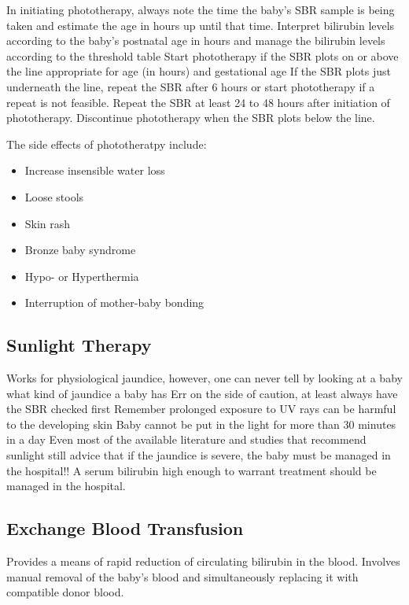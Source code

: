 \documentclass[
  letterpaper,
  DIV=11,
  numbers=noendperiod]{scrreprt}
\providecommand{\tightlist}{%
  \setlength{\itemsep}{0pt}\setlength{\parskip}{0pt}}\usepackage{longtable,booktabs,array}
\begin{document}
In initiating phototherapy, always note the time the baby's SBR sample
is being taken and estimate the age in hours up until that time.
Interpret bilirubin levels according to the baby's postnatal age in
hours and manage the bilirubin levels according to the threshold table
Start phototherapy if the SBR plots on or above the line appropriate for
age (in hours) and gestational age If the SBR plots just underneath the
line, repeat the SBR after 6 hours or start phototherapy if a repeat is
not feasible. Repeat the SBR at least 24 to 48 hours after initiation of
phototherapy. Discontinue phototherapy when the SBR plots below the
line.

The side effects of phototheratpy include:

\begin{itemize}
\tightlist
\item
  Increase insensible water loss
\item
  Loose stools
\item
  Skin rash
\item
  Bronze baby syndrome
\item
  Hypo- or Hyperthermia
\item
  Interruption of mother-baby bonding
\end{itemize}

\hypertarget{sunlight-therapy}{%
\subsection{Sunlight Therapy}\label{sunlight-therapy}}

Works for physiological jaundice, however, one can never tell by looking
at a baby what kind of jaundice a baby has Err on the side of caution,
at least always have the SBR checked first Remember prolonged exposure
to UV rays can be harmful to the developing skin Baby cannot be put in
the light for more than 30 minutes in a day Even most of the available
literature and studies that recommend sunlight still advice that if the
jaundice is severe, the baby must be managed in the hospital!! A serum
bilirubin high enough to warrant treatment should be managed in the
hospital.

\hypertarget{exchange-blood-transfusion}{%
\subsection{Exchange Blood
Transfusion}\label{exchange-blood-transfusion}}

Provides a means of rapid reduction of circulating bilirubin in the
blood. Involves manual removal of the baby's blood and simultaneously
replacing it with compatible donor blood.
\end{document}
